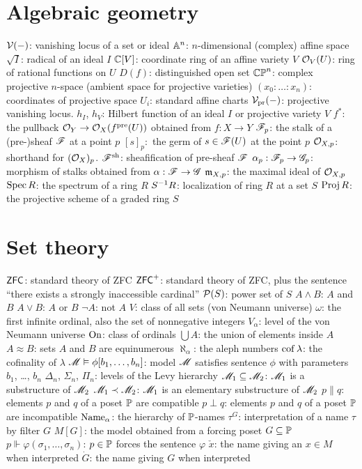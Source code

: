 \section{Algebraic geometry}
\begin{itemize}
	\ii $\mathcal V(-)$: vanishing locus of a set or ideal
	\ii $\mathbb A^n$: $n$-dimensional (complex) affine space
	\ii $\sqrt I$: radical of an ideal $I$
	\ii $\mathbb C[V]$: coordinate ring of an affine variety $V$
	\ii $\mathcal O_V(U)$: ring of rational functions on $U$
	\ii $D(f)$: distinguished open set
	\ii $\mathbb{CP}^n$: complex projective $n$-space (ambient space for projective varieties)
	\ii $(x_0 : \dots : x_n)$: coordinates of projective space
	\ii $U_i$: standard affine charts
	\ii $\mathcal V_{\text{pr}}(-)$: projective vanishing locus.
	\ii $h_I$, $h_V$: Hilbert function of an ideal $I$ or projective variety $V$
	\ii $f^\ast$: the pullback $\mathcal O_Y \to \mathcal O_X(f^{\text{pre}}(U))$ obtained from $f : X \to Y$
	\ii $\mathscr F_p$: the stalk of a (pre-)sheaf $\mathscr F$ at a point $p$
	\ii $[s]_p:$ the germ of $s \in \mathscr F(U)$ at the point $p$
	\ii $\mathcal O_{X,p}$: shorthand for $(\mathcal O_X)_p$.
	\ii $\mathscr F^\mathrm{sh}$: sheafification of pre-sheaf $\mathscr F$
	\ii $\alpha_p : \mathscr F_p \to \mathscr G_p$: morphism of stalks obtained from $\alpha : \mathscr F \to \mathscr G$
	\ii $\mathfrak m_{X,p}$: the maximal ideal of $\mathcal O_{X,p}$
	\ii $\operatorname{Spec} R$: the spectrum of a ring $R$
	\ii $S^{-1} R$: localization of ring $R$ at a set $S$
	\ii $\operatorname{Proj} R$: the projective scheme of a graded ring $S$
\end{itemize}

\section{Set theory}
\begin{itemize}
	\ii $\mathsf{ZFC}$: standard theory of ZFC
	\ii $\mathsf{ZFC}^+$: standard theory of ZFC, plus the sentence
	``there exists a strongly inaccessible cardinal''
	\ii $\mathcal P(S)$: power set of $S$
	\ii $A \land B$: $A$ and $B$
	\ii $A \lor B$: $A$ or $B$
	\ii $\neg A$: not $A$
	\ii $V$: class of all sets (von Neumann universe)
	\ii $\omega$: the first infinite ordinal, also the set of nonnegative integers
	\ii $V_\alpha$: level of the von Neumann universe
	\ii $\mathrm{On}$: class of ordinals
	\ii $\bigcup A$: the union of elements inside $A$
	\ii $A \approx B$: sets $A$ and $B$ are equinumerous
	\ii $\aleph_\alpha$: the aleph numbers
	\ii $\operatorname{cof} \lambda$: the cofinality of $\lambda$
	\ii $\mathscr M \vDash \phi[b_1, \dots, b_n]$: model $\mathscr M$ satisfies sentence $\phi$
	with parameters $b_1$, \dots, $b_n$
	\ii $\Delta_n$, $\Sigma_n$, $\Pi_n$: levels of the Levy hierarchy
	\ii $\mathscr M_1 \subseteq \mathscr M_2$: $\mathscr M_1$ is a substructure of $\mathscr M_2$
	\ii $\mathscr M_1 \prec \mathscr M_2$: $\mathscr M_1$ is an elementary substructure of $\mathscr M_2$
	\ii $p \parallel q$: elements $p$ and $q$ of a poset $\mathbb P$ are compatible
	\ii $p \perp q$: elements $p$ and $q$ of a poset $\mathbb P$ are incompatible
	\ii $\text{Name}_\alpha$: the hierarchy of $\mathbb P$-names
	\ii $\tau^G$: interpretation of a name $\tau$ by filter $G$
	\ii $M[G]$: the model obtained from a forcing poset $G \subseteq \mathbb P$
	\ii $p \Vdash \varphi(\sigma_1, \dots, \sigma_n)$: $p \in \mathbb P$ forces the sentence $\varphi$
	\ii $\check x$: the name giving an $x \in M$ when interpreted
	\ii $\dot G$: the name giving $G$ when interpreted
\end{itemize}


\endinput
Consider adding:
lim (convergence)
group presentation

TODO: stopped at start of IX
TODO: run through preamble.tex
